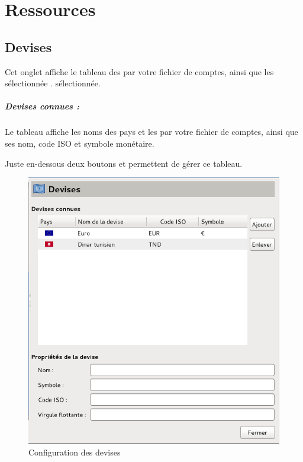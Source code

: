 \section{Ressources\label{setup-resources}}


\subsection{Devises\label{setup-resources-currencies}}

Cet onglet affiche le tableau des  par votre fichier de comptes, ainsi que les  \ifIllustration sélectionnée . 
\else sélectionnée.
\fi

\subparagraph{Devises connues :\label{setup-resources-currencies-known}}

Le tableau affiche les noms des pays et les  par votre fichier de comptes, ainsi que ses nom, code ISO et symbole monétaire.


Juste en-dessous deux boutons  et  permettent de gérer ce tableau.



\ifIllustration
\begin{figure}[ht]
\begin{center}
\includegraphics[scale=0.5]{image/screenshot/setup_currencies}
\end{center}
\caption{Configuration des devises}
\label{setup-currencies-img}
\end{figure}
\fi

